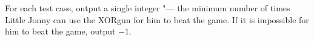 For each test case, output a single integer "--- the minimum number of times Little Jonny can use the XORgun for him to beat the game. If it is impossible for him to beat the game, output $-1$.
